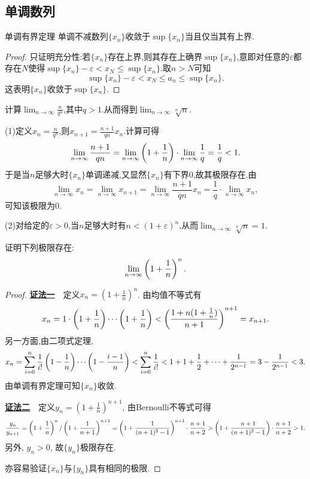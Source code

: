 \subsection{单调数列}

\begin{theorem}{单调有界定理}
	单调不减数列$\{ x_n \}$收敛于$\sup \{ x_n \}$当且仅当其有上界.
\end{theorem}
\begin{proof}
	只证明充分性:若$\{ x_n \}$存在上界,则其存在上确界$\sup \{ x_n \}$,意即对任意的$\varepsilon$都存在$N$使得$\sup \{x_n\}-\varepsilon < x_N \leq \sup \{ x_n \}$.取$n>N$可知$$\sup \{x_n\}-\varepsilon < x_N \leq a_n \leq \sup \{ x_n \}.$$
	这表明$\{ x_n \}$收敛于$\sup \{ x_n \}$.
\end{proof}

\begin{example}
	计算$\lim_{n\to \infty} \frac{n}{q^n}$,其中$q>1$.从而得到$\lim_{n\to \infty} \sqrt[n]{n}$.
\end{example}
\begin{solution}
	(1)定义$x_n=\frac{n}{q^n}$,则$x_{n+1}=\frac{n+1}{qn}x_n$.计算可得$$\lim_{n \to \infty} \frac{n+1}{qn} = \lim_{n \to \infty} \left( 1+\frac{1}{n} \right) \cdot \lim_{n \to \infty} \frac{1}{q} = \frac{1}{q} < 1.$$
	于是当$n$足够大时$\{ x_n \}$单调递减,又显然$\{ x_n \}$有下界$0$,故其极限存在.由$$\lim_{n \to \infty} x_{n} = \lim_{n \to \infty} x_{n+1} = \lim_{n \to \infty} \frac{n+1}{qn} x_n = \frac{1}{q} \cdot \lim_{n \to \infty} x_n,$$可知该极限为$0$.
	
	(2)对给定的$\varepsilon > 0$,当$n$足够大时有$n<(1+\varepsilon)^n$,从而$\lim_{n\to \infty} \sqrt[n]{n} =1$.
\end{solution}

\begin{example}
	证明下列极限存在:$$\lim_{n\to \infty} \left( 1+\frac{1}{n} \right)^n.$$
\end{example}
\begin{proof}
	\underline{\textbf{证法一}}~~定义$x_n=(1+\frac{1}{n})^n$. 由均值不等式有$$x_n = 1 \cdot \left( 1+\frac{1}{n} \right) \cdots \left( 1+\frac{1}{n} \right) < \left( \frac{1+n(1+\frac{1}{n})}{n+1} \right)^{n+1} = x_{n+1}. $$
	另一方面,由二项式定理, $$x_n = \sum_{i=0}^{n} \frac{1}{i!} \left( 1-\frac{1}{n} \right) \cdots \left( 1-\frac{i-1}{n} \right) < \sum_{i=0}^{n} \frac{1}{i!} < 1+1+\frac{1}{2}+\cdots + \frac{1}{2^{n-1}} = 3-\frac{1}{2^{n-1}}<3. $$
	由单调有界定理可知$\{ x_n \}$收敛. 
	
	\underline{\textbf{证法二}}~~定义$y_n=(1+\frac{1}{n})^{n+1}$, 由Bernoulli不等式可得$$\frac{y_n}{y_{n+1}} = \left( 1+\frac{1}{n} \right)^n / \left( 1+\frac{1}{n+1} \right)^{n+1} = \left( 1+\frac{1}{(n+1)^2-1} \right)^{n+1} \cdot \frac{n+1}{n+2} > \left( 1+\frac{n+1}{(n+1)^2-1} \right) \cdot \frac{n+1}{n+2} > 1. $$
	另外, $y_n>0$, 故$\{ y_n \}$极限存在. 
	
	亦容易验证$\{ x_n \}$与$\{ y_n \}$具有相同的极限.
\end{proof}

